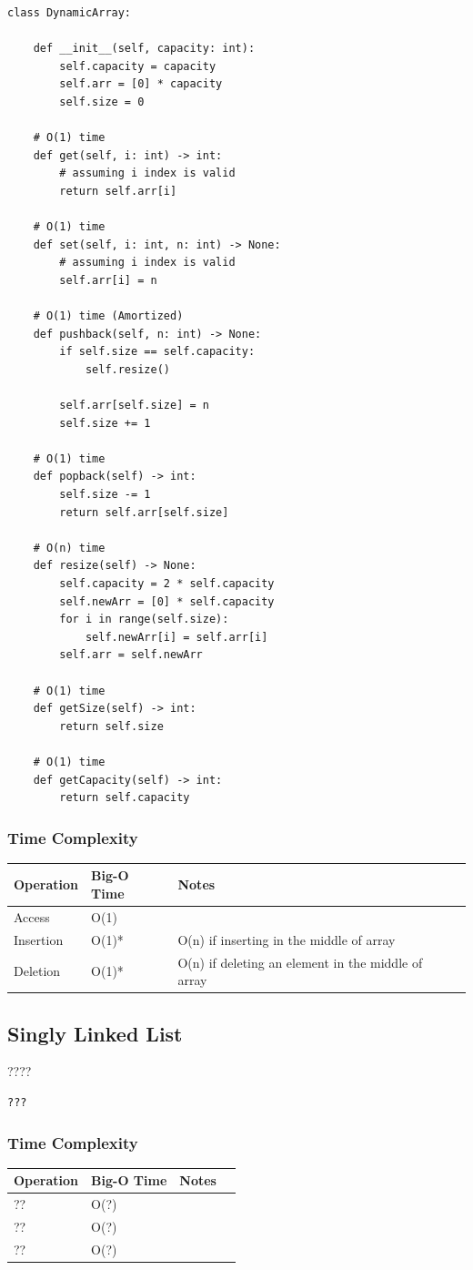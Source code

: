 \documentclass[12pt,a4paper]{article}
\begin{document}
\begin{verbatim}
class DynamicArray:
    
    def __init__(self, capacity: int):
        self.capacity = capacity
        self.arr = [0] * capacity
        self.size = 0

    # O(1) time
    def get(self, i: int) -> int:
        # assuming i index is valid
        return self.arr[i]

    # O(1) time
    def set(self, i: int, n: int) -> None:
        # assuming i index is valid
        self.arr[i] = n

    # O(1) time (Amortized)
    def pushback(self, n: int) -> None:
        if self.size == self.capacity:
            self.resize()

        self.arr[self.size] = n
        self.size += 1

    # O(1) time
    def popback(self) -> int:
        self.size -= 1
        return self.arr[self.size]

    # O(n) time
    def resize(self) -> None:
        self.capacity = 2 * self.capacity
        self.newArr = [0] * self.capacity
        for i in range(self.size):
            self.newArr[i] = self.arr[i]
        self.arr = self.newArr

    # O(1) time
    def getSize(self) -> int:
        return self.size
    
    # O(1) time
    def getCapacity(self) -> int:
        return self.capacity
\end{verbatim}
\subsubsection{Time Complexity}
\begin{table}[h]
\centering
\begin{tabular}{|l|l|l|l|}
\hline
Operation & Big-O Time & Notes \\ \hline
Access & O(1) & \\ \hline
Insertion & O(1)* & O(n) if inserting in the middle of array \\ \hline
Deletion & O(1)* & O(n) if deleting an element in the middle of array \\ \hline

\end{tabular}
\end{table}




\subsection{Singly Linked List}
????

\begin{verbatim}
???
\end{verbatim}
\subsubsection{Time Complexity}
\begin{table}[h]
\centering
\begin{tabular}{|l|l|l|l|}
\hline
Operation & Big-O Time & Notes \\ \hline
?? & O(?) & \\ \hline
?? & O(?) &  \\ \hline
?? & O(?) & \\ \hline

\end{tabular}
\end{table}
\end{document}

